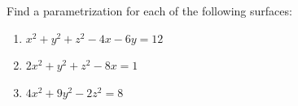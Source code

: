 \documentclass[openany]{book}
\begin{document}
\begin{prob}[7]
Find a parametrization for each of the following surfaces:

\begin{enumerate}
    \item[(a)] \( x^2 + y^2 + z^2 - 4x - 6y = 12 \)
    \item[(b)] \( 2x^2 + y^2 + z^2 - 8x = 1 \)
    \item[(c)] \( 4x^2 + 9y^2 - 2z^2 = 8 \)
\end{enumerate}
\end{prob}
\end{document}
